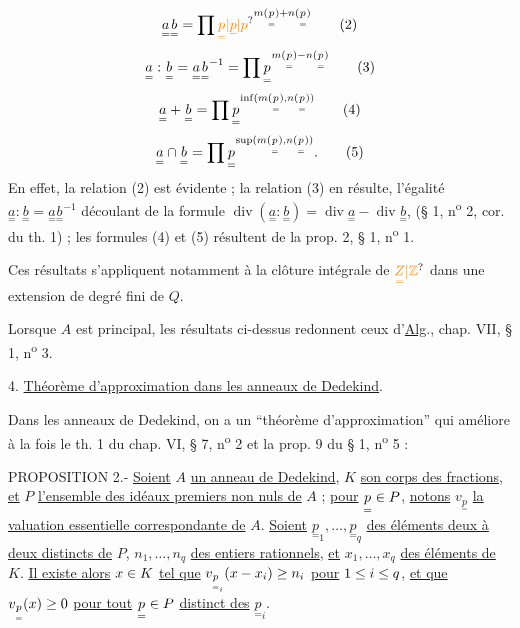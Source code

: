 \[
\underset{=}{a}\underset{=}{b}=\handwritten{\prod}\unsure{\underset{=}{p}|\underline{p}|p}^{m(\underset{=}{p})+n(\underset{=}{p})}\tag*{(2)}
\]
\[
\underset{=}{a}:\underset{=}{b}=\underset{=}{a}\underset{=}{b}^{-1}=\prod\underset{=}{p}^{m(\underset{=}{p})-n(\underset{=}{p})}\tag*{(3)}
\]
\[
\underset{=}{a}+\underset{=}{b}=\prod\underset{=}{p}^{\inf(m(\underset{=}{p}),n(\underset{=}{p}))}\tag*{(4)}
\]
\[
\underset{=}{a}\cap\underset{=}{b}=\prod\underset{=}{p}^{\sup(m(\underset{=}{p}),n(\underset{=}{p}))}.\tag*{(5)}
\]
En effet, la relation (2) est évidente ; la relation (3) en résulte, l'égalité $\underset{=}{a}:\underset{=}{b}=\underset{=}{a}\underset{=}{b}^{-1}$ découlant de la formule $\operatorname{div}(\underset{=}{a}:\underset{=}{b})=\operatorname{div}\underset{=}{a}-\operatorname{div}\underset{=}{b}$, (§ 1, n\textsuperscript{o} 2, cor. du th. 1) ; les formules (4) et (5) résultent de la prop. 2, § 1, n\textsuperscript{o} 1.

Ces résultats s'appliquent notamment à la clôture intégrale de $\unsure{\underset{=}{Z}|\mathbb Z}$ dans une extension de degré fini de $Q$.

Lorsque $A$ est principal, les résultats ci-dessus redonnent ceux d'\uline{Alg}., chap. VII, § 1, n\textsuperscript{o} 3.

4. \uline{Théorème d'approximation dans les anneaux de Dedekind}.

Dans les anneaux de Dedekind, on a un ``théorème d'approximation'' qui améliore à la fois le th. 1 du chap. VI, § 7, n\textsuperscript{o} 2 et la prop. 9 du § 1, n\textsuperscript{o} 5 :

PROPOSITION 2.- \uline{Soient} $A$ \uline{un anneau de Dedekind}, $K$ \uline{son corps des fractions}, \uline{et} $P$ \uline{l'ensemble des idéaux premiers non nuls de} $A$ ; \uline{pour} $\underset{=}{p}\in P$, \uline{notons} $v_{\underset{=}{p}}$ \uline{la valuation essentielle correspondante de} $A$. \uline{Soient} $\underset{=}{p}_1,\ldots,\underset{=}{p}_q$ \uline{des éléments deux à deux distincts de} $P$, $n_1,\ldots,n_q$ \uline{des entiers rationnels}, \uline{et} $x_1,\ldots,x_q$ \uline{des éléments de} $K$. \uline{Il existe alors} $x\in K$ \uline{tel que} $v_{\underset{=}{p}_i}(x-x_i)\geq n_i$ \uline{pour} $1\leq i\leq q$, \uline{et que} $v_{\underset{=}{p}}(x)\geq0$ \uline{pour tout} $\underset{=}{p}\in P$ \uline{distinct des} $\underset{=}{p}_i$.


